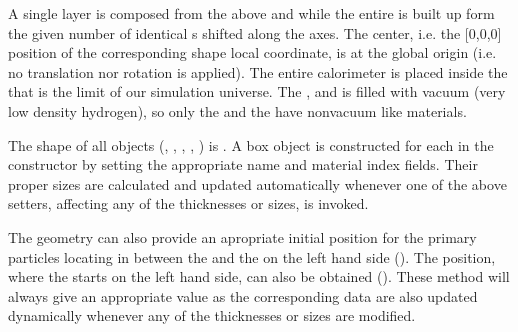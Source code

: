 \documentclass[letterpaper,10pt,english]{sphinxmanual}
\begin{document}
\begin{fulllineitems}
\sphinxAtStartPar
A single layer is composed from the above  and  while the entire  is built up form the given number of identical s shifted along the  axes. The  center, i.e. the {[}0,0,0{]} position of the corresponding {\hyperref[\detokenize{Simulation/SimulationCodeDoc:class_box}]{}} shape local coordinate, is at the global origin (i.e. no translation nor rotation is applied). The entire calorimeter is placed inside the  that is the limit of our simulation universe. The ,  and  is filled with vacuum (very low density hydrogen), so only the  and the  have non\sphinxhyphen{}vacuum like materials.

\sphinxAtStartPar
The shape of all objects (, , , , ) is . A box object is constructed for each in the constructor by setting the appropriate name and material index fields. Their proper sizes are calculated and updated automatically whenever one of the above setters, affecting any of the thicknesses or sizes, is invoked.

\sphinxAtStartPar
The geometry can also provide an apropriate initial  position for the primary particles locating in between the  and the  on the left hand side (). The  position, where the  starts on the left hand side, can also be obtained (). These method will always give an appropriate value as the corresponding data are also updated dynamically whenever any of the thicknesses or sizes are modified.


\end{fulllineitems}
\end{document}
